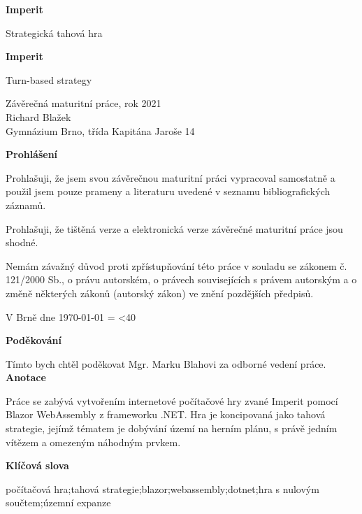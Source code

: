 \documentclass[a4paper,12pt]{article}
\author{Richard Blažek}
\makeatletter
\newcommand{\repeatchar}[2]{%
  \begingroup
  \my@repeat@count=\z@
  \@whilenum\my@repeat@count<#1\do{#2\advance\my@repeat@count\@ne}%
  \endgroup
}
\makeatother
\begin{document}
\begin{titlepage}
    \begin{center}

	\vspace*{3cm}            
	\Huge
	\textbf{Imperit}
            
	\vspace{0.5cm}
	\LARGE
	Strategická tahová hra
        
	\vspace*{1cm}
	\Huge
	\textbf{Imperit}
            
	\vspace{0.5cm}
	\LARGE
	Turn-based strategy
            
	\vfill
            
	\large
        Závěrečná maturitní práce, rok 2021\\
	Richard Blažek\\
	Gymnázium Brno, třída Kapitána Jaroše 14
    \end{center}
\end{titlepage}
\thispagestyle{empty}
\Large\textbf{Prohlášení}\normalsize

Prohlašuji, že jsem svou závěrečnou maturitní práci vypracoval samostatně a použil jsem pouze prameny a literaturu uvedené v seznamu bibliografických záznamů.

Prohlašuji, že tištěná verze a elektronická verze závěrečné maturitní práce jsou shodné.

Nemám závažný důvod proti zpřístupňování této práce v souladu se zákonem č. 121/2000 Sb., o právu autorském, o právech souvisejících s právem autorským a o změně některých zákonů (autorský zákon) ve znění pozdějších předpisů. 

V Brně dne \today{} \repeatchar{40}{.}
\newpage
\thispagestyle{empty}
\Large\textbf{Poděkování}\normalsize

Tímto bych chtěl poděkovat Mgr. Marku Blahovi za odborné vedení práce.
\newpage
\thispagestyle{empty}
\Large\textbf{Anotace}\normalsize

Práce se zabývá vytvořením internetové počítačové hry zvané Imperit pomocí Blazor WebAssembly z frameworku .NET. Hra je koncipovaná jako tahová strategie, jejímž tématem je dobývání území na herním plánu, s právě jedním vítězem a omezeným náhodným prvkem.

\Large\textbf{Klíčová slova}\normalsize

počítačová hra;tahová strategie;blazor;webassembly;dotnet;hra s nulovým součtem;územní expanze
\end{document}
